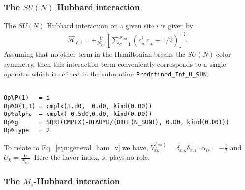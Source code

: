 \subsubsection{The $SU(N)$ Hubbard interaction}

The $SU(N)$ Hubbard interaction on a given site $i$ is given by 
\begin{align}
\hat{\mathcal{H}}_{V,i} =
+ \frac{U}{N_{\mathrm{col}}}\left[
\sum\limits_{\sigma=1}^{N_{\mathrm{col}}}
\left(  c^{\dagger}_{i \sigma} c^{\phantom\dagger}_{i\sigma}  -1/2 \right) \right]^{2}.
\end{align} 
Assuming that no other term in the Hamiltonian breaks the $SU(N) $  color symmetry,  then this interaction term  conveniently corresponds to  a single 
operator  which is defined in the subroutine \texttt{Predefined\_Int\_U\_SUN}.   

\begin{lstlisting}[style=fortran]

Op%P(1)   = i
Op%O(1,1) = cmplx(1.d0,  0.d0, kind(0.D0))
Op%alpha  = cmplx(-0.5d0,0.d0, kind(0.D0))
Op%g      = SQRT(CMPLX(-DTAU*U/(DBLE(N_SUN)), 0.D0, kind(0.D0))) 
Op%type   = 2

\end{lstlisting}

To relate to  Eq.~\eqref{eqn:general_ham_v} we have,   $V_{x y}^{(is)} =  \delta_{x,y} \delta_{x,i}$, $\alpha_{is} = -\frac{1}{2}$ and $U_{k} =  \frac{U}{N_{\mathrm{col}}}$.   Here  the flavor index, $s$,  plays no role. 


\subsubsection{The $M_z$-Hubbard interaction}

